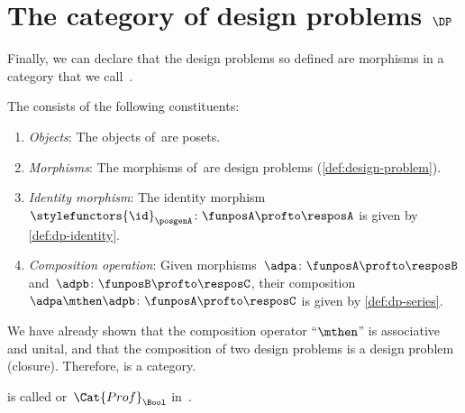 
\section{The category of design problems $\DP$}

Finally, we can declare that the design problems so defined are morphisms in a category that we call~\iindex{\DP}.


\begin{definition}
    \label{def:DP}
    The \emph{ \DP} consists of the following constituents:
    \begin{enumerate}
        \item \emph{Objects}: The objects of~\DP are posets.
        \item \emph{Morphisms}: The morphisms of~\DP are design problems (\cref{def:design-problem}).
        \item \emph{Identity morphism}: The identity morphism~$\stylefunctors{\id}_\posgenA \colon \funposA \profto \resposA$ is given by \cref{def:dp-identity}.
        \item \emph{Composition operation}: Given morphisms~$\adpa \colon  \funposA \profto \resposB$ and~$\adpb \colon \funposB \profto \resposC$, their composition~$\adpa \mthen \adpb\colon \funposA\profto \resposC$ is given by \cref{def:dp-series}.
    \end{enumerate}
\end{definition}

We have already shown that the composition operator ``$\mthen$'' is associative and unital, and that the composition of two design problems is a design problem (closure).
Therefore, \DP is a category.

\begin{remark}
    \DP is called \feas or~$\Cat{Prof}_\Bool$ in~\cite{fong2019}.
\end{remark}

